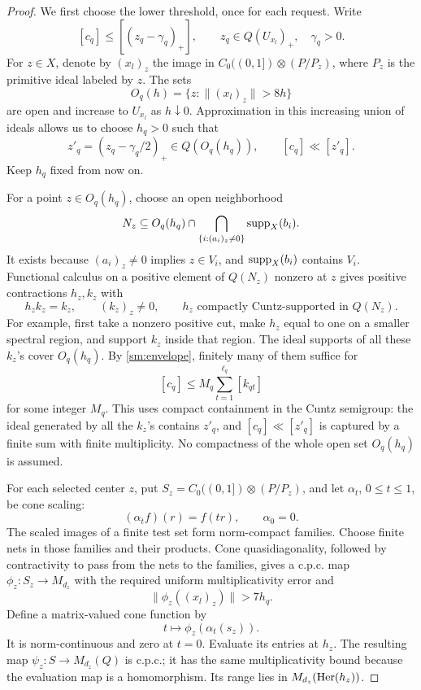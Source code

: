 \begin{proof}
We first choose the lower threshold, once for each request.
Write
\[
 [c_q]\leq[(z_q-\gamma_q)_+],
 \qquad z_q\in Q(U_{x_l})_+,\quad\gamma_q>0.
\]
For \(z\in X\), denote by \((x_l)_z\) the image in
\(C_0((0,1])\otimes(P/P_z)\), where \(P_z\) is the
primitive ideal labeled by \(z\).  The sets
\[
 O_q(h)=\{z:\|(x_l)_z\|>8h\}
\]
are open and increase to \(U_{x_l}\) as \(h\downarrow0\).
Approximation in this increasing union of ideals allows us
to choose \(h_q>0\) such that
\begin{equation}\label{sm:envelope}
 z'_q=(z_q-\gamma_q/2)_+\in Q(O_q(h_q)),
 \qquad [c_q]\ll[z'_q].
\end{equation}
Keep \(h_q\) fixed from now on.

For a point \(z\in O_q(h_q)\), choose an open neighborhood
\[
 N_z\subseteq O_q(h_q)\cap
 \bigcap_{\{i:(a_i)_z\ne0\}}\operatorname{supp}_X(b_i).
\]
It exists because \((a_i)_z\ne0\) implies \(z\in V_i\),
and \(\operatorname{supp}_X(b_i)\) contains \(V_i\).
Functional calculus on a positive element of \(Q(N_z)\)
nonzero at \(z\) gives positive contractions \(h_z,k_z\)
with
\begin{equation}\label{sm:plateau}
 h_zk_z=k_z,
 \qquad (k_z)_z\ne0,
 \qquad h_z\text{ compactly Cuntz-supported in }Q(N_z).
\end{equation}
For example, first take a nonzero positive cut, make \(h_z\)
equal to one on a smaller spectral region, and support
\(k_z\) inside that region.
The ideal supports of all these \(k_z\)'s cover
\(O_q(h_q)\).  By \eqref{sm:envelope}, finitely many of
them suffice for
\begin{equation}\label{sm:finite-cover}
 [c_q]\leq M_q\sum_{t=1}^{\ell_q}[k_{qt}]
\end{equation}
for some integer \(M_q\).
This uses compact containment in the Cuntz semigroup: the
ideal generated by all the \(k_z\)'s contains \(z'_q\),
and \([c_q]\ll[z'_q]\) is captured by a finite sum with
finite multiplicity.  No compactness of the whole open set
\(O_q(h_q)\) is assumed.

For each selected center \(z\), put
\(S_z=C_0((0,1])\otimes(P/P_z)\), and let
\(\alpha_t\), \(0\leq t\leq1\), be cone scaling:
\[
 (\alpha_t f)(r)=f(tr),
 \qquad \alpha_0=0.
\]
The scaled images of a finite test set form norm-compact
families.  Choose finite nets in those families and their
products.  Cone quasidiagonality, followed by contractivity
to pass from the nets to the families, gives a c.p.c. map
\(\phi_z:S_z\to M_{d_z}\) with the required uniform
multiplicativity error and
\begin{equation}\label{sm:matrix-signal}
 \|\phi_z((x_l)_z)\|>7h_q.
\end{equation}
Define a matrix-valued cone function by
\[
 t\longmapsto\phi_z(\alpha_t(s_z)).
\]
It is norm-continuous and zero at \(t=0\).  Evaluate its
entries at \(h_z\).  The resulting map
\(\psi_z:S\to M_{d_z}(Q)\) is c.p.c.; it has the same
multiplicativity bound because the evaluation map is a
homomorphism.  Its range lies in \(M_{d_z}(\operatorname{Her}(h_z))\).


\end{proof}
